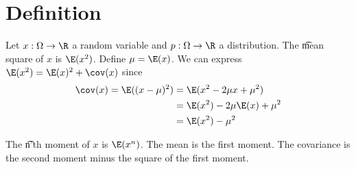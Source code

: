 
\section*{Definition}

Let $x: \Omega  \to \R $ a random variable and $p: \Omega  \to \R $ a distribution.
The \t{mean square} of $x$ is $\E (x^2)$.
Define $\mu  = \E (x)$.
We can express $\E (x^2) = \E (x)^2 + \cov(x)$ since
  \[
\begin{aligned}
\cov(x) = \E ((x -\mu )^2)
&= \E (x^2 - 2\mu x + \mu ^2) \\
&= \E (x^2) -2\mu \E (x) + \mu ^2 \\
&= \E (x^2) - \mu ^2
\end{aligned}
  \]

The \t{n'th moment} of $x$ is $\E (x^n)$.
The mean is the first moment.
The covariance is the second moment minus the square of the first moment.

\blankpage